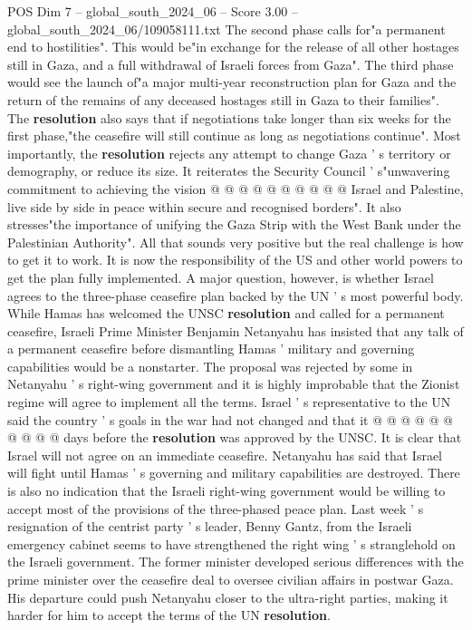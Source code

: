 \begin{textsample}{POS Dim 7 – global\_south\_2024\_06 – Score 3.00 – global\_south\_2024\_06/109058111.txt}
The second phase calls for"a permanent end to hostilities".
This would be"in exchange for the release of all other hostages still in Gaza, and a full withdrawal of Israeli forces from Gaza".
The third phase would see the launch of"a major multi-year reconstruction plan for Gaza and the return of the remains of any deceased hostages still in Gaza to their families".
The \textbf{resolution} also says that if negotiations take longer than six weeks for the first phase,"the ceasefire will still continue as long as negotiations continue".
Most importantly, the \textbf{resolution} rejects any attempt to change Gaza ' s territory or demography, or reduce its size.
It reiterates the Security Council ' s"unwavering commitment to achieving the vision @ @ @ @ @ @ @ @ @ @ Israel and Palestine, live side by side in peace within secure and recognised borders".
It also stresses"the importance of unifying the Gaza Strip with the West Bank under the Palestinian Authority".
All that sounds very positive but the real challenge is how to get it to work.
It is now the responsibility of the US and other world powers to get the plan fully implemented.
A major question, however, is whether Israel agrees to the three-phase ceasefire plan backed by the UN ' s most powerful body.
While Hamas has welcomed the UNSC \textbf{resolution} and called for a permanent ceasefire, Israeli Prime Minister Benjamin Netanyahu has insisted that any talk of a permanent ceasefire before dismantling Hamas ' military and governing capabilities would be a nonstarter.
The proposal was rejected by some in Netanyahu ' s right-wing government and it is highly improbable that the Zionist regime will agree to implement all the terms.
Israel ' s representative to the UN said the country ' s goals in the war had not changed and that it @ @ @ @ @ @ @ @ @ @ days before the \textbf{resolution} was approved by the UNSC.
It is clear that Israel will not agree on an immediate ceasefire.
Netanyahu has said that Israel will fight until Hamas ' s governing and military capabilities are destroyed.
There is also no indication that the Israeli right-wing government would be willing to accept most of the provisions of the three-phased peace plan.
Last week ' s resignation of the centrist party ' s leader, Benny Gantz, from the Israeli emergency cabinet seems to have strengthened the right wing ' s stranglehold on the Israeli government.
The former minister developed serious differences with the prime minister over the ceasefire deal to oversee civilian affairs in postwar Gaza.
His departure could push Netanyahu closer to the ultra-right parties, making it harder for him to accept the terms of the UN \textbf{resolution}.

\end{textsample}
